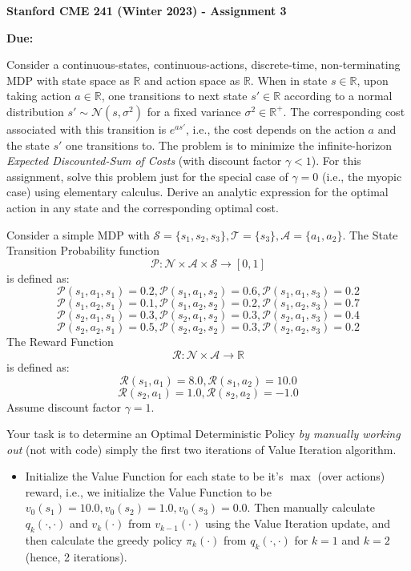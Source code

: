 \documentclass[12pt]{exam}
\begin{document}
\begin{center}
{\large {\bf Stanford CME 241 (Winter 2023) - Assignment 3}}
\end{center}
 
{\large{\bf Due:}}
\begin{questions}

 Consider a continuous-states, continuous-actions, discrete-time, non-terminating MDP with state space as $\mathbb{R}$ and action space as $\mathbb{R}$. When in state $s\in \mathbb{R}$, upon taking action $a\in \mathbb{R}$, one transitions to next state $s' \in \mathbb{R}$ according to a normal distribution $s' \sim \mathcal{N}(s, \sigma^2)$ for a fixed variance $\sigma^2 \in \mathbb{R}^+$. The corresponding cost associated with this transition is $e^{as'}$, i.e., the cost depends on the action $a$ and the state $s'$ one transitions to. The problem is to minimize the infinite-horizon {\em Expected Discounted-Sum of Costs} (with discount factor $\gamma < 1$). For this assignment, solve this problem just for the special case of $\gamma = 0$ (i.e., the myopic case) using elementary calculus. Derive an analytic expression for the optimal action in any state and the corresponding optimal cost.

 Consider a simple MDP with $\mathcal{S} = \{s_1, s_2, s_3\}, \mathcal{T} =\{s_3\}, \mathcal{A} = \{a_1, a_2\}$. The State Transition Probability function
$$\mathcal{P}: \mathcal{N} \times \mathcal{A} \times \mathcal{S} \rightarrow [0, 1]$$
is defined as:
$$\mathcal{P}(s_1, a_1, s_1) = 0.2, \mathcal{P}(s_1, a_1, s_2) = 0.6, \mathcal{P}(s_1, a_1, s_3) = 0.2$$
$$\mathcal{P}(s_1, a_2, s_1) = 0.1, \mathcal{P}(s_1, a_2, s_2) = 0.2, \mathcal{P}(s_1, a_2, s_3) = 0.7$$
$$\mathcal{P}(s_2, a_1, s_1) = 0.3, \mathcal{P}(s_2, a_1, s_2) = 0.3, \mathcal{P}(s_2, a_1, s_3) = 0.4$$
$$\mathcal{P}(s_2, a_2, s_1) = 0.5, \mathcal{P}(s_2, a_2, s_2) = 0.3, \mathcal{P}(s_2, a_2, s_3) = 0.2$$
The Reward Function 
$$\mathcal{R}: \mathcal{N} \times \mathcal{A} \rightarrow \mathbb{R}$$
is defined as:
$$\mathcal{R}(s_1, a_1) = 8.0, \mathcal{R}(s_1, a_2) = 10.0$$
$$\mathcal{R}(s_2, a_1) = 1.0, \mathcal{R}(s_2, a_2) = -1.0$$
Assume discount factor $\gamma = 1$.

Your task is to determine an Optimal Deterministic Policy {\em by manually working out} (not with code) simply the first two iterations of Value Iteration algorithm. 

\begin{itemize}
	\item Initialize the Value Function for each state to be it's $\max$ (over actions) reward, i.e., we initialize the Value Function to be $v_0(s_1) = 10.0, v_0(s_2) = 1.0, v_0(s_3) = 0.0$. Then manually calculate $q_k(\cdot, \cdot)$ and $v_k(\cdot)$ from $v_{k - 1}( \cdot)$ using the Value Iteration update, and then calculate the greedy policy $\pi_k(\cdot)$ from $q_k(\cdot, \cdot)$ for $k = 1$ and $k = 2$ (hence, 2 iterations).
	

\end{itemize}
\end{questions}
\end{document}
